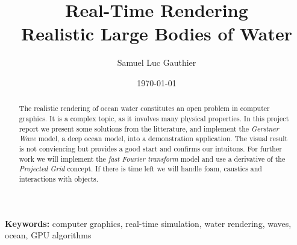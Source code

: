 \title{\textbf{Real-Time Rendering}\\\Large{Realistic Large Bodies of Water}}

\author{\normalsize{Samuel Luc Gauthier}}
\date{\normalsize{\today}}
\maketitle

\begin{abstract}
The realistic rendering of ocean water constitutes an open problem in computer
graphics. It is a complex topic, as it involves many physical properties. In
this project report we present some solutions from the litterature, and
implement the \textit{Gerstner Wave} model, a deep ocean model, into a
demonstration application. The visual result is not conviencing but provides a
good start and confirms our intuitons. For further work we will implement the
\textit{fast Fourier transform} model and use a derivative of the
\textit{Projected Grid} concept. If there is time left we will handle foam,
caustics and interactions with objects.
\end{abstract}

\small{{\bf Keywords:} computer graphics, real-time simulation, water rendering,
waves, ocean, GPU algorithms}
